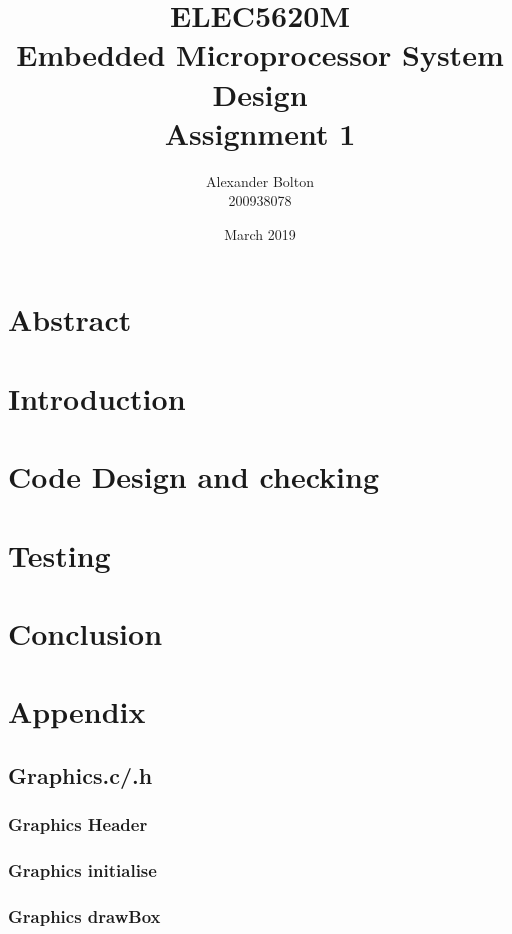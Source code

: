 \documentclass[a4paper,12pt]{article}
\begin{document}
\title{ELEC5620M \\ Embedded Microprocessor System Design \\ Assignment 1}
\author{Alexander Bolton \\ 200938078}
\date{March 2019}
\maketitle
\section{Abstract}
\newpage

\tableofcontents
\newpage

\section{Introduction}

\section{Code Design and checking}

\section{Testing}

\section{Conclusion}

\newpage
\section{Appendix}
\subsection{Graphics.c/.h}
\subsubsection{Graphics Header}
\subsubsection{Graphics initialise}

\subsubsection{Graphics drawBox}
\end{document}
